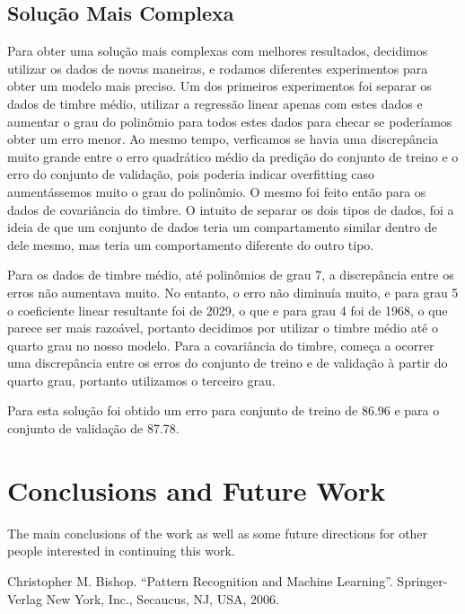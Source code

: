 \documentclass[conference]{IEEEtran}
\begin{document}
\subsection{Solução Mais Complexa}
Para obter uma solução mais complexas com melhores resultados, decidimos utilizar os dados de novas maneiras, e rodamos diferentes experimentos para obter um modelo mais preciso. Um dos primeiros experimentos foi separar os dados de timbre médio, utilizar a regressão linear apenas com estes dados e aumentar o grau do polinômio para todos estes dados para checar se poderíamos obter um erro menor. Ao mesmo tempo, verficamos se havia uma discrepância muito grande entre o erro quadrático médio da predição do conjunto de treino e o erro do conjunto de validação, pois poderia indicar overfitting caso aumentássemos muito o grau do polinômio. O mesmo foi feito então para os dados de covariância do timbre. O intuito de separar os dois tipos de dados, foi a ideia de que um conjunto de dados teria um compartamento similar dentro de dele mesmo, mas teria um comportamento diferente do outro tipo.

Para os dados de timbre médio, até polinômios de grau 7, a discrepância entre os erros não aumentava muito. No entanto, o erro não diminuía muito, e para grau 5 o coeficiente linear resultante foi de 2029, o que e para grau 4 foi de 1968, o que parece ser mais razoável, portanto decidimos por utilizar o timbre médio até o quarto grau no nosso modelo. Para a covariância do timbre, começa a ocorrer uma discrepância entre os erros do conjunto de treino e de validação à partir do quarto grau, portanto utilizamos o terceiro grau.

Para esta solução foi obtido um erro para conjunto de treino de 86.96 e para o conjunto de validação de 87.78. 

\section{Conclusions and Future Work}

The main conclusions of the work as well as some future directions for other people interested in continuing this work. 

\begin{thebibliography}{00}
 Christopher M. Bishop. ``Pattern Recognition and Machine Learning''. Springer-Verlag New York, Inc., Secaucus, NJ, USA, 2006. 
\end{thebibliography}
\end{document}
